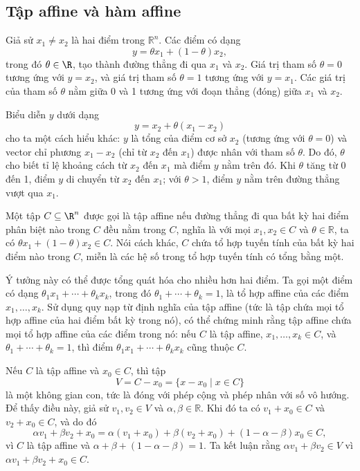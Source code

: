 \subsection{Tập affine và hàm affine}
\label{section:affine_set}
Giả sử $x_1 \neq x_2$ là hai điểm trong $\mathbb{R}^n$. Các điểm có dạng
\begin{equation}
    y = \theta x_1 + (1-\theta)x_2,
\end{equation}
trong đó $\theta \in \R$, tạo thành đường thẳng đi qua $x_1$ và $x_2$. Giá trị tham số $\theta = 0$ tương ứng với $y = x_2$, và giá trị tham số $\theta = 1$ tương ứng với $y = x_1$. Các giá trị của tham số $\theta$ nằm giữa 0 và 1 tương ứng với đoạn thẳng (đóng) giữa $x_1$ và $x_2$.

\noindent Biểu diễn $y$ dưới dạng
\begin{equation}
    y = x_2 + \theta(x_1 - x_2)
\end{equation}
cho ta một cách hiểu khác: $y$ là tổng của điểm cơ sở $x_2$ (tương ứng với $\theta = 0$) và vector chỉ phương $x_1 - x_2$ (chỉ từ $x_2$ đến $x_1$) được nhân với tham số $\theta$. Do đó, $\theta$ cho biết tỉ lệ khoảng cách từ $x_2$ đến $x_1$ mà điểm $y$ nằm trên đó. Khi $\theta$ tăng từ 0 đến 1, điểm $y$ di chuyển từ $x_2$ đến $x_1$; với $\theta > 1$, điểm $y$ nằm trên đường thẳng vượt qua $x_1$.

\begin{define}
    \label{define:affine_set}
    Một tập $C \subseteq \R^n$ được gọi là tập affine nếu đường thẳng đi qua bất kỳ hai điểm phân biệt nào trong $C$ đều nằm trong $C$, nghĩa là với mọi $x_1, x_2 \in C$ và $\theta \in \mathbb{R}$, ta có $\theta x_1 + (1-\theta)x_2 \in C$. Nói cách khác, $C$ chứa tổ hợp tuyến tính của bất kỳ hai điểm nào trong $C$, miễn là các hệ số trong tổ hợp tuyến tính có tổng bằng một.
\end{define}

Ý tưởng này có thể được tổng quát hóa cho nhiều hơn hai điểm. Ta gọi một điểm có dạng
$\theta_1 x_1 + \cdots + \theta_k x_k$, trong đó $\theta_1 + \cdots + \theta_k = 1$, là tổ hợp affine của các điểm $x_1, \ldots, x_k$. Sử dụng quy nạp từ định nghĩa của tập affine (tức là tập chứa mọi tổ hợp affine của hai điểm bất kỳ trong nó), có thể chứng minh rằng tập affine chứa mọi tổ hợp affine của các điểm trong nó: nếu $C$ là tập affine, $x_1, \ldots, x_k \in C$, và $\theta_1 + \cdots + \theta_k = 1$, thì điểm $\theta_1 x_1 + \cdots + \theta_k x_k$ cũng thuộc $C$.

\noindent Nếu $C$ là tập affine và $x_0 \in C$, thì tập
\begin{equation}
    V = C - x_0 = \{x - x_0 \mid x \in C\}
\end{equation}
là một không gian con, tức là đóng với phép cộng và phép nhân với số vô hướng. Để thấy điều này, giả sử $v_1, v_2 \in V$ và $\alpha, \beta \in \mathbb{R}$. Khi đó ta có $v_1 + x_0 \in C$ và $v_2 + x_0 \in C$, và do đó
\begin{equation}
    \alpha v_1 + \beta v_2 + x_0 = \alpha(v_1 + x_0) + \beta(v_2 + x_0) + (1-\alpha-\beta)x_0 \in C,
\end{equation}
vì $C$ là tập affine và $\alpha + \beta + (1-\alpha-\beta) = 1$. Ta kết luận rằng $\alpha v_1 + \beta v_2 \in V$ vì $\alpha v_1 + \beta v_2 + x_0 \in C$.

